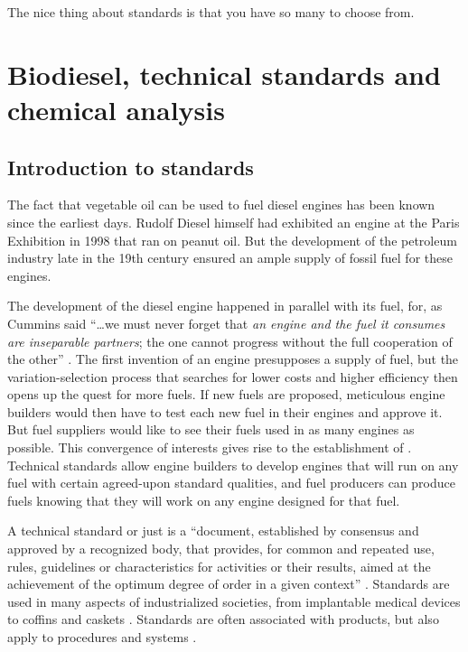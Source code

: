 
\begin{savequote}[\quotewidth]
The nice thing about standards is that you have so many to choose from.
\end{savequote}


\chapter[Biodiesel standards]{Biodiesel, technical standards and chemical analysis} %

\label{Chapter3} %

\section{Introduction to standards}
\label{Sec:Intro}

The fact that vegetable oil can be used to fuel diesel engines has been known
since the earliest days. Rudolf Diesel himself had exhibited an engine at the
Paris Exhibition in 1998 \autocite{Knothe2010} that ran on peanut oil. But the
development of the petroleum industry late in the 19th century ensured an ample
supply of fossil fuel for these engines.

The development of the diesel engine happened in parallel with its fuel, for, as
Cummins said ``\ldots we must never forget that \textit{an engine and the fuel
it consumes are inseparable partners}; the one cannot progress without the full
cooperation of the other'' \autocite{Cummins1989}. The first invention of an
engine presupposes a supply of fuel, but the variation-selection process that
searches for lower costs and higher efficiency then opens up the quest for more
fuels. If new fuels are proposed, meticulous engine builders would then have to
test each new fuel in their engines and approve it. But fuel suppliers would
like to see their fuels used in as many engines as possible. This convergence of
interests gives rise to the establishment of .
Technical standards allow engine builders to develop engines that will run on
any fuel with certain agreed-upon standard qualities, and fuel producers can
produce fuels knowing that they will work on any engine designed for that fuel.

A technical standard or just  is a ``document, established by
consensus and approved by a recognized body, that provides, for common and
repeated use, rules, guidelines or characteristics for activities or their
results, aimed at the achievement of the optimum degree of order in a given
context'' \autocite{Hatto2010}. Standards are used in many aspects of
industrialized societies, from implantable medical devices \autocite{ISO2019} to
coffins and caskets \autocite{SABS1993}. Standards are often associated with
products, but also apply to procedures \autocite{ISO2015} and systems
\autocite{ISO2017}.

